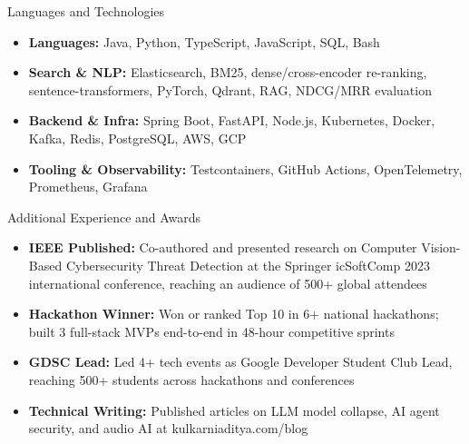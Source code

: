 \documentclass{mcdowellcv}
\begin{document}
\begin{cvsection}{Languages and Technologies}

  \begin{cvsubsection}{}{}{}
    \begin{itemize}
      \item \textbf{Languages:} Java, Python, TypeScript, JavaScript, SQL, Bash
      \item \textbf{Search \& NLP:} Elasticsearch, BM25, dense/cross-encoder re-ranking, sentence-transformers, PyTorch, Qdrant, RAG, NDCG/MRR evaluation
      \item \textbf{Backend \& Infra:} Spring Boot, FastAPI, Node.js, Kubernetes, Docker, Kafka, Redis, PostgreSQL, AWS, GCP
      \item \textbf{Tooling \& Observability:} Testcontainers, GitHub Actions, OpenTelemetry, Prometheus, Grafana
    \end{itemize}
  \end{cvsubsection}

\end{cvsection}

\begin{cvsection}{Additional Experience and Awards}

  \begin{cvsubsection}{}{}{}
    \begin{itemize}
      \item \textbf{IEEE Published:} Co-authored and presented research on Computer Vision-Based Cybersecurity Threat Detection at the Springer icSoftComp 2023 international conference, reaching an audience of 500+ global attendees
      \item \textbf{Hackathon Winner:} Won or ranked Top 10 in 6+ national hackathons; built 3 full-stack MVPs end-to-end in 48-hour competitive sprints
      \item \textbf{GDSC Lead:} Led 4+ tech events as Google Developer Student Club Lead, reaching 500+ students across hackathons and conferences
      \item \textbf{Technical Writing:} Published articles on LLM model collapse, AI agent security, and audio AI at kulkarniaditya.com/blog
    \end{itemize}
  \end{cvsubsection}

\end{cvsection}
\end{document}

